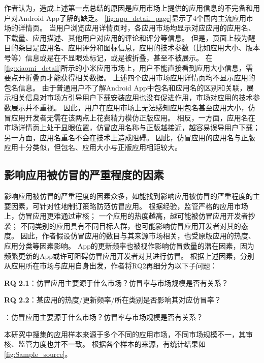 作者认为，造成上述第一点总结的原因是应用市场上提供的应用信息的不完备和用户对Android App了解的缺乏。
\autoref{fig:app_detail_page}显示了4个国内主流应用市场的详情页。
当用户浏览应用详情页时，各应用市场均显示对应应用的应用名、下载量、应用描述、其他用户对应用的评论和评分等信息。
但是，页面上较为醒目的条目是应用名、应用评分和图标信息，应用的技术参数（比如应用大小、版本号等）信息或是在不显眼处标记，或是被折叠，甚至不被展示。
在\autoref{fig:xiaomi_detail}所示的小米应用市场上，用户不能直接看到应用大小信息，需要点开折叠页才能获得相关数据。
上述四个应用市场应用详情页均不显示应用的包名信息。
由于普通用户不了解Android App中包名和应用名的区别和关联，展示相关信息对市场方引导用户下载安装应用也没有促进作用，市场对应用的技术参数展示并不重视。
因此，用户在应用市场上无法感知应用包名甚至应用大小，仿冒应用开发者无需在该两点上花费精力模仿正版应用。
相反，一方面，应用名在市场详情页上处于显眼位置，仿冒应用名称与正版越接近，越容易误导用户下载；另一方面，应用名重名不会在技术上造成阻碍。
因此，仿冒应用的应用名与正版应用十分类似，但包名、应用大小与正版应用相距较大。

\subsection{影响应用被仿冒的严重程度的因素}
\label{sec:quantitativeStudy}


影响应用被仿冒的严重程度的因素众多，如能找到影响应用被仿冒的严重程度的主要因素，可针对性地制订策略防范仿冒应用。
根据经验，监管严格的应用市场上，仿冒应用更难通过审核；
一个应用的热度越高，越可能被仿冒应用开发者抄袭；
不同类别的应用具有不同目标人群，也可能影响仿冒应用开发者对其的态度。
因此，作者假设仿冒应用的数目与其来源市场相关，也受原版应用的热度、应用分类等因素影响。
App的更新频率也被视作影响仿冒数量的潜在因素，因为频繁更新的App或许可阻碍仿冒应用开发者对其进行仿冒。
根据上述因素，分别从应用所在市场与应用自身出发，作者将RQ2再细分为以下子问题：

{\bf RQ 2.1}：仿冒应用主要源于什么市场？仿冒率与市场规模是否有关系？

{\bf RQ 2.2}：某应用的热度/更新频率/所在类别是否影响其对应仿冒率？

：仿冒应用主要源于什么市场？仿冒率与市场规模是否有关系？

本研究中搜集的应用样本来源于多个不同的应用市场，不同市场规模不一，其审核、监管力度也并不一致。
根据各个样本的来源，有统计结果如\autoref{fig:Sample_source}。

